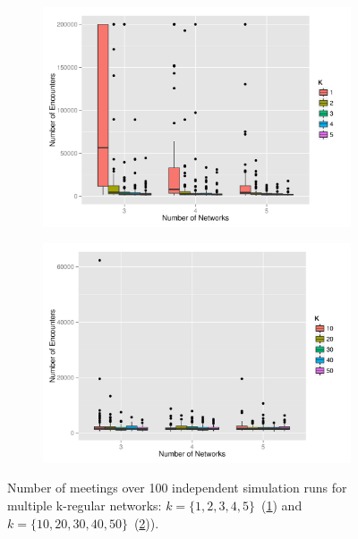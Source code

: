 \documentclass[preprint,number]{elsarticle}
\begin{document}
\begin{figure}[H]
	\centering
	\begin{subfigure}{.49\linewidth}
		\centering
		\includegraphics[width=1\linewidth]{"../analysis/pdf/context_permeability_encounters_kregular_12345"}
		\caption{}
		\label{fig:ctx_perm_kreg_12345}
	\end{subfigure}%
	\begin{subfigure}{.49\linewidth}
		\centering
		\includegraphics[width=1\linewidth]{"../analysis/pdf/context_permeability_encounters_kregular_1020304050"}
		\caption{}
		\label{fig:ctx_perm_kreg_1020304050}
	\end{subfigure}
	\begin{minipage}{0.9\linewidth}
		\vspace{0.2cm}
		\caption{Number of meetings over 100 independent simulation runs for multiple k-regular networks: $k=\{1,2,3,4,5\}$~(\ref{fig:ctx_perm_kreg_12345}) and $k=\{10,20,30,40,50\}$~(\ref{fig:ctx_perm_kreg_1020304050})).}
		\label{fig:ctx_perm_kreg}
	\end{minipage}
\end{figure}
\end{document}
